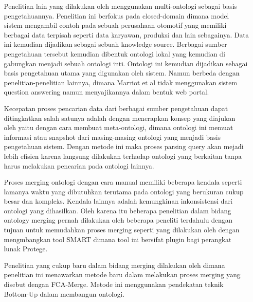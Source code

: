 Penelitian lain yang dilakukan oleh \citet*{marriot} menggunakan multi-ontologi sebagai basis pengetahuannya. Penelitian ini berfokus pada closed-domain dimana model sistem mengambil contoh pada sebuah perusahaan otomotif yang memiliki berbagai data terpisah seperti data karyawan, produksi dan lain sebagainya. Data ini kemudian dijadikan sebagai sebuah knowledge source. Berbagai sumber pengetahuan tersebut kemudian dibentuk ontologi lokal yang kemudian di gabungkan menjadi sebuah ontologi inti. Ontologi ini kemudian dijadikan sebagai basis pengetahuan utama yang digunakan oleh sistem. Namun berbeda dengan penelitian-penelitian lainnya, dimana Marriot et al tidak menggunakan sistem question answering namun menyajikannya dalam bentuk web portal.

Kecepatan proses pencarian data dari berbagai sumber pengetahuan dapat ditingkatkan salah satunya adalah dengan menerapkan konsep yang diajukan oleh \citet*{vargas_motta} yaitu dengan cara membuat meta-ontologi, dimana ontologi ini memuat informasi atau snapshot dari masing-masing ontologi yang menjadi basis pengetahuan sistem. Dengan metode ini maka proses parsing query akan mejadi lebih efisien karena langsung dilakukan terhadap ontologi yang berkaitan tanpa harus melakukan pencarian pada ontologi lainnya.

Proses merging ontologi dengan cara manual memiliki beberapa kendala seperti lamanya waktu yang dibutuhkan terutama pada ontologi yang berukuran cukup besar dan kompleks. Kendala lainnya adalah kemungkinan inkonsistensi dari ontologi yang dihasilkan. Oleh karena itu beberapa penelitian dalam bidang ontology merging pernah dilakukan oleh beberapa peneliti terdahulu dengan tujuan untuk memudahkan proses merging seperti yang dilakukan oleh \citet*{noy_mussen} dengan mengmbangkan tool SMART dimana tool ini bersifat plugin bagi perangkat lunak Protege. 

Penelitian yang cukup baru dalam bidang merging dilakukan oleh \citet*{stumme_maedche} dimana penelitian ini menawarkan metode baru dalam melakukan proses merging yang disebut dengan FCA-Merge. Metode ini menggunakan pendekatan teknik Bottom-Up dalam membangun ontologi.